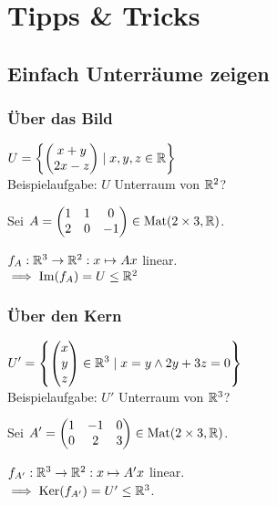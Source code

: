 \section*{Tipps \& Tricks}

\subsection*{Einfach Unterräume zeigen}

\subsubsection*{Über das Bild}
$\displaystyle U=\left\{\begin{pmatrix} x+y \\ 2x-z \end{pmatrix} \mid x,y,z\in\mathbb{R} \right\}$ \\
Beispielaufgabe: $U$ Unterraum von $\mathbb{R}^2$?

Sei $\displaystyle A=\begin{pmatrix} 1 & 1 & 0 \\ 2 & 0 & -1 \end{pmatrix} \in\operatorname{Mat}(2 \times 3, \mathbb{R})$.

$f_A: \mathbb{R}^3 \to \mathbb{R}^2: x \mapsto Ax$ linear. \\
$\implies \operatorname{Im}(f_A)=U \le \mathbb{R}^2$

\subsubsection*{Über den Kern}
$\displaystyle U'=\left\{\begin{pmatrix} x\\y\\z \end{pmatrix}\in\mathbb{R}^3 \mid x=y \land 2y+3z=0\right\}$ \\
Beispielaufgabe: $U'$ Unterraum von $\mathbb{R}^3$?

Sei $\displaystyle A'=\begin{pmatrix} 1 & -1 & 0 \\ 0 & 2 & 3 \end{pmatrix} \in\operatorname{Mat}(2\times3, \mathbb{R})$.

$f_{A'}: \mathbb{R}^3 \to \mathbb{R}^2: x\mapsto A'x$ linear. \\
$\implies \operatorname{Ker}(f_{A'})=U' \le \mathbb{R}^3$.
